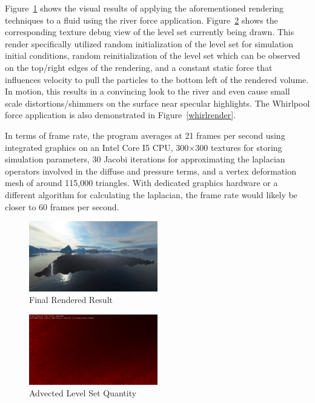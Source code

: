 \documentclass[conference]{IEEEtran}
\begin{document}
Figure~\ref{fluidrender} shows the visual results of applying the aforementioned rendering techniques to a fluid using the river force application. Figure~\ref{levelsetrender} shows the corresponding texture debug view of the level set currently being drawn. This render specifically utilized random initialization of the level set for simulation initial conditions, random reinitialization of the level set which can be observed on the top/right edges of the rendering, and a constant static force that influences velocity to pull the particles to the bottom left of the rendered volume. In motion, this results in a convincing look to the river and even cause small scale distortions/shimmers on the surface near specular highlights. The Whirlpool force application is also demonstrated in Figure~\ref{whirlrender}.

In terms of frame rate, the program averages at 21 frames per second using integrated graphics on an Intel Core I5 CPU, 300$\times$300 textures for storing simulation parameters, 30 Jacobi iterations for approximating the laplacian operators involved in the diffuse and pressure terms, and a vertex deformation mesh of around 115,000 triangles. With dedicated graphics hardware or a different algorithm for calculating the laplacian, the frame rate would likely be closer to 60 frames per second.

\begin{figure}[htbp]
\centerline{\includegraphics[width=0.5\textwidth]{waterrender.png}}
\caption{Final Rendered Result}
\label{fluidrender}
\end{figure}

\begin{figure}[htbp]
\centerline{\includegraphics[width=0.5\textwidth]{levelset.png}}
\caption{Advected Level Set Quantity}
\label{levelsetrender}
\end{figure}
\end{document}
